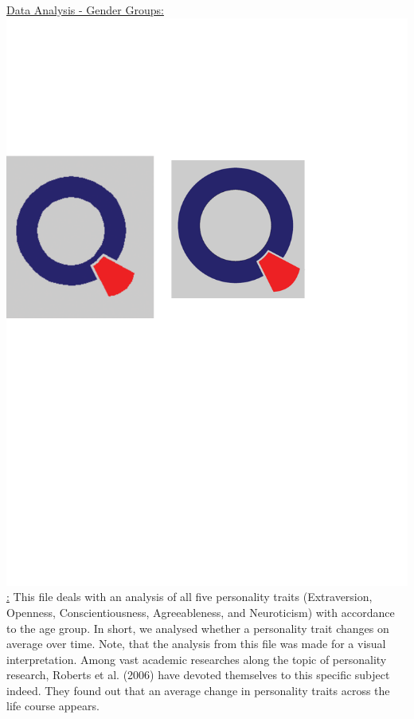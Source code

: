 \underline{Data Analysis - Gender Groups:
 \href{https://github.com/Matthias2193/SPL/blob/master/Big5DataAnalysisAgeGender/DataAnalysis_PTGenderAgeGroup.R}{\includegraphics[scale = 0.06]{Figures/qletlogo.pdf}} :} 
\newline 
\newline
 This file deals with an analysis of all five personality traits (Extraversion, Openness, Conscientiousness, Agreeableness, and Neuroticism) with accordance to the age group. In short, we analysed whether a personality trait changes on average over time. Note, that the analysis from this file was made for a visual interpretation. Among vast academic researches along the topic of personality research, Roberts et al. (2006) have devoted themselves to this specific subject indeed. They found out that an average change in personality traits across the life course appears.
 \newline \newline
